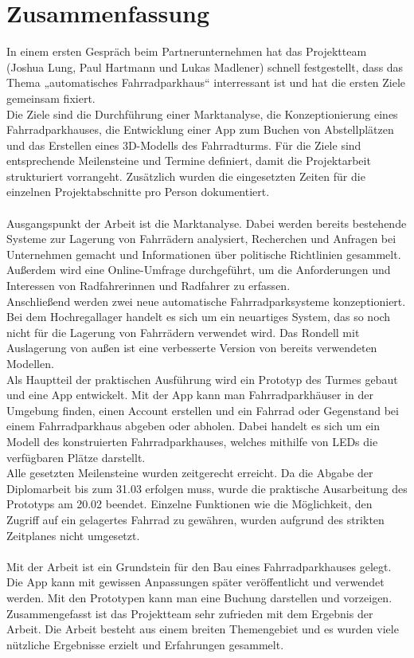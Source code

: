 \section{Zusammenfassung}

In einem ersten Gespräch beim Partnerunternehmen hat das Projektteam (Joshua Lung, Paul Hartmann und Lukas Madlener) schnell festgestellt, dass das Thema „automatisches Fahrradparkhaus“ interressant ist und hat die ersten Ziele gemeinsam fixiert. \\
Die Ziele sind die Durchführung einer Marktanalyse, die Konzeptionierung eines Fahrradparkhauses, die Entwicklung einer App zum Buchen von Abstellplätzen und das Erstellen eines 3D-Modells des Fahrradturms. Für die Ziele sind entsprechende Meilensteine und Termine definiert, damit die Projektarbeit strukturiert vorrangeht. Zusätzlich wurden die eingesetzten Zeiten für die einzelnen Projektabschnitte pro Person dokumentiert.\\ \\
Ausgangspunkt der Arbeit ist die Marktanalyse. Dabei werden bereits bestehende Systeme zur Lagerung von Fahrrädern analysiert, Recherchen und Anfragen bei Unternehmen gemacht und Informationen über politische Richtlinien gesammelt. Außerdem wird eine Online-Umfrage durchgeführt, um die Anforderungen und Interessen von Radfahrerinnen und Radfahrer zu erfassen.\\
Anschließend werden zwei neue automatische Fahrradparksysteme konzeptioniert. Bei dem Hochregallager handelt es sich um ein neuartiges System, das so noch nicht für die Lagerung von Fahrrädern verwendet wird. Das Rondell mit Auslagerung von außen ist eine verbesserte Version von bereits verwendeten Modellen.\\
Als Hauptteil der praktischen Ausführung wird ein Prototyp des Turmes gebaut und eine App entwickelt. Mit der App kann man Fahrradparkhäuser in der Umgebung finden, einen Account erstellen und ein Fahrrad oder Gegenstand bei einem Fahrradparkhaus abgeben oder abholen. Dabei handelt es sich um ein Modell des konstruierten Fahrradparkhauses, welches mithilfe von LEDs die verfügbaren Plätze darstellt. \\
Alle gesetzten Meilensteine wurden zeitgerecht erreicht. Da die Abgabe der Diplomarbeit bis zum 31.03 erfolgen muss, wurde die praktische Ausarbeitung des Prototyps am 20.02 beendet. Einzelne Funktionen wie die Möglichkeit, den Zugriff auf ein gelagertes Fahrrad zu gewähren, wurden aufgrund des strikten Zeitplanes nicht umgesetzt.\\ \\

Mit der Arbeit ist ein Grundstein für den Bau eines Fahrradparkhauses gelegt. Die App kann mit gewissen Anpassungen später veröffentlicht und verwendet werden. Mit den Prototypen kann man eine Buchung darstellen und vorzeigen.\\
Zusammengefasst ist das Projektteam sehr zufrieden mit dem Ergebnis der Arbeit. Die Arbeit besteht aus einem breiten Themengebiet und es wurden viele nützliche Ergebnisse erzielt und Erfahrungen gesammelt.\\

